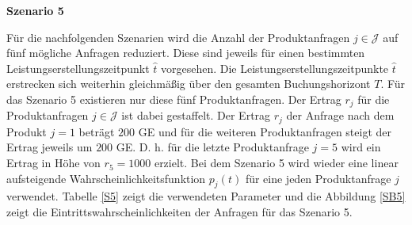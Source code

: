 \textbf{Szenario 5}

Für die nachfolgenden Szenarien wird die Anzahl der Produktanfragen $j\in\mathcal{J}$ auf fünf mögliche Anfragen reduziert. Diese sind jeweils für einen bestimmten Leistungserstellungszeitpunkt $\hat t$ vorgesehen. Die Leistungserstellungszeitpunkte $\hat t$ erstrecken sich weiterhin gleichmäßig über den gesamten Buchungshorizont $T$. Für das Szenario 5 existieren nur diese fünf Produktanfragen. Der Ertrag $r_j$ für die Produktanfragen $j\in\mathcal{J}$ ist dabei gestaffelt. Der Ertrag $r_j$ der Anfrage nach dem Produkt $j=1$ beträgt $200$ GE und für die weiteren Produktanfragen steigt der Ertrag jeweils um $200$ GE. D. h. für die letzte Produktanfrage $j=5$ wird ein Ertrag in Höhe von $r_5=1000$ erzielt. Bei dem Szenario 5 wird wieder eine linear aufsteigende Wahrscheinlichkeitsfunktion $p_j(t)$ für eine jeden Produktanfrage $j$ verwendet. Tabelle \ref{S5} zeigt die verwendeten Parameter und die Abbildung \ref{SB5} zeigt die Eintrittswahrscheinlichkeiten der Anfragen für das Szenario 5.\\

